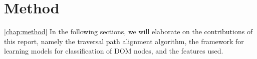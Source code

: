 \chapter{Method}
\ref{chap:method}
In the following sections, we will elaborate on the contributions of this report, namely the
traversal path alignment algorithm, the framework for learning models for classification of
DOM nodes, and the features used. 


